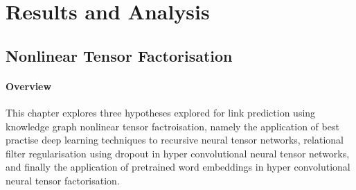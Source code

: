 
\ifpdf
     \graphicspath{{/Users/luyolomagangane/Documents/Academics/Figures/Chapter5/}}
\else
    \graphicspath{{Chapter1/Figs/Vector/}{Chapter1/Figs/}}
\fi

\chapter{Results and Analysis}  %

\section{Nonlinear Tensor Factorisation}
\subsubsection{Overview}
This chapter explores three hypotheses explored for link prediction using knowledge graph nonlinear tensor factroisation, namely the application of best practise deep learning techniques to recursive neural tensor networks, relational filter regularisation using dropout in hyper convolutional neural tensor networks, and finally the application of pretrained word embeddings in hyper convolutional neural tensor factorisation. \newline 

